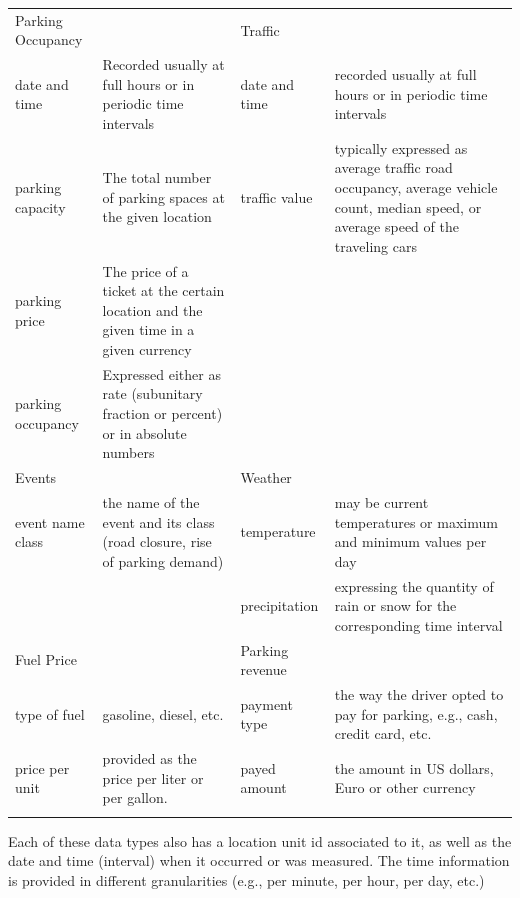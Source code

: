 \documentclass{ws-ijait}
\begin{document}
	\begin{table}
		{\begin{tabular}{lp{4cm}lp{4cm}}	
				\toprule
				Parking Occupancy & & Traffic & \\
				\colrule
				date and time & Recorded usually at full hours or in periodic time intervals & date and time & recorded usually at full hours or in periodic time intervals \\
				parking capacity & The total number of parking spaces at the given location & traffic value & typically expressed as average traffic road occupancy, average vehicle count, median speed, or average speed of the traveling cars \\
				parking price & The price of a ticket at the certain location and the given time in a given currency & & \\
				parking occupancy & Expressed either as rate (subunitary fraction or percent) or in absolute numbers & & \\
				\colrule
				Events & & Weather & \\
				\colrule
				event name class & the name of the event and its class (road closure, rise of parking demand) & temperature & may be current temperatures or maximum and minimum values per day \\
				& & 	precipitation & expressing the quantity of rain or snow for the corresponding time interval \\
				\colrule
				Fuel Price & & Parking revenue & \\
				\colrule
				type of fuel & gasoline, diesel, etc. & payment type & the way the driver opted to pay for parking, e.g., cash, credit card, etc. \\
				
				price per unit & provided as the price per liter or per gallon. & payed amount & the amount in US dollars, Euro or other currency\\
				
				\botrule
			\end{tabular}}
			\begin{tabnote}
				Each of these data types also has a location unit id associated to it, as well as the date and time (interval) when it occurred or was measured. The time information is provided in different granularities (e.g., per minute, per hour, per day, etc.)
			\end{tabnote}
			\label{tab:sfpark_data}
		\end{table}
		
\end{document}
